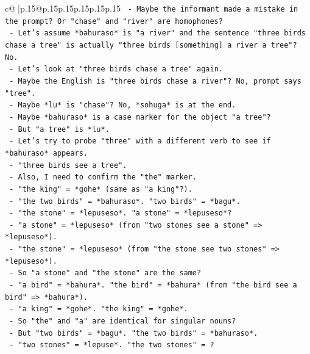 \documentclass{article}
\begin{document}
{\begin{supertabular}{c@{$\;$}|p{.15\linewidth}@{}p{.15\linewidth}p{.15\linewidth}p{.15\linewidth}p{.15\linewidth}p{.15\linewidth}}
{{{\texttt{          {-} Maybe the informant made a mistake in the prompt? Or "chase" and "river" are homophones?} \\
\texttt{          {-} Let's assume *bahuraso* is "a river" and the sentence "three birds chase a tree" is actually "three birds {[}something{]} a river a tree"? No.} \\
\texttt{          {-} Let's look at "three birds chase a tree" again.} \\
\texttt{          {-} Maybe the English is "three birds chase a river"? No, prompt says "tree".} \\
\texttt{          {-} Maybe *lu* is "chase"? No, *sohuga* is at the end.} \\
\texttt{          {-} Maybe *bahuraso* is a case marker for the object "a tree"?} \\
\texttt{          {-} But "a tree" is *lu*.} \\
\texttt{          {-} Let's try to probe "three" with a different verb to see if *bahuraso* appears.} \\
\texttt{          {-} "three birds see a tree".} \\
\texttt{          {-} Also, I need to confirm the "the" marker.} \\
\texttt{          {-} "the king" = *gohe* (same as "a king"?).} \\
\texttt{          {-} "the two birds" = *bahuraso*. "two birds" = *bagu*.} \\
\texttt{          {-} "the stone" = *lepuseso*. "a stone" = *lepuseso*?} \\
\texttt{          {-} "a stone" = *lepuseso* (from "two stones see a stone" => *lepuseso*).} \\
\texttt{          {-} "the stone" = *lepuseso* (from "the stone see two stones" => *lepuseso*).} \\
\texttt{          {-} So "a stone" and "the stone" are the same?} \\
\texttt{          {-} "a bird" = *bahura*. "the bird" = *bahura* (from "the bird see a bird" => *bahura*).} \\
\texttt{          {-} "a king" = *gohe*. "the king" = *gohe*.} \\
\texttt{          {-} So "the" and "a" are identical for singular nouns?} \\
\texttt{          {-} But "two birds" = *bagu*. "the two birds" = *bahuraso*.} \\
\texttt{          {-} "two stones" = *lepuse*. "the two stones" = ?} \\
}}}
\end{supertabular}}
\end{document}

